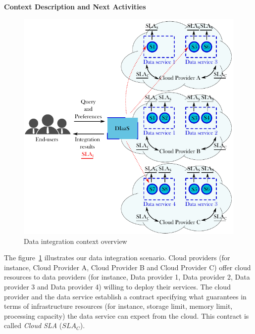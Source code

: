 \documentclass[12pt,a4paper,oneside]{article}
\theoremstyle{definition}
\begin{document}
\begin{center}
\textbf{\large{Context Description and Next Activities}}
\end{center}
\bigskip

\begin{figure}[b!]
\center
\includegraphics[scale=1]{figures/scenario.pdf}\caption{Data integration context overview}\label{fig:context}
\end{figure}

The figure~\ref{fig:context} illustrates our data integration scenario. Cloud providers (for instance, Cloud Provider A, Cloud Provider B and Cloud Provider C) offer cloud resources to data providers (for instance, Data provider 1, Data provider 2, Data provider 3 and Data provider 4) willing to deploy their services. The cloud provider and the data service establish a contract specifying what guarantees in terms of infrastructure resources (for instance, storage limit, memory limit, processing capacity) the data service can expect from the cloud. This contract is called \textsl{Cloud SLA} ($SLA_{C}$).
\end{document}
